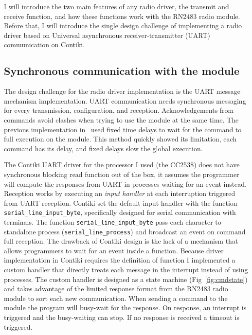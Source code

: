 I will introduce the two main features of any radio driver, the transmit and receive
function, and how these functions work with the RN2483 radio module.
Before that, I will introduce the single design challenge of implementing a radio
driver based on Universal asynchronous receiver-transmitter (UART) communication on Contiki.

\subsection{Synchronous communication with the module}

The design challenge for the radio driver implementation is the
UART message mechanism implementation.
UART communication needs synchronous messaging for every
transmission, configuration, and reception.
Acknowledgements from commands avoid
clashes when trying to use the module at the same time.
The previous implementation in~\cite{8847137} used fixed time delays to
wait for the command to full execution on the module. This method
quickly showed its limitation, each command has its delay, and
fixed delays slow the global execution.

The Contiki UART driver for the processor I used (the CC2538) does not have synchronous
blocking read function out of the box, it assumes the programmer will compute the
responses from UART in processes waiting for an event instead.
Reception works by executing an \emph{input handler} at each interruption
triggered from UART reception.
Contiki set the default input handler with the function
\lstinline{serial_line_input_byte},
specifically designed for serial communication with terminals.
The function \lstinline{serial_line_input_byte} pass each character to standalone
process (\lstinline{serial_line_process}) and broadcast an event on command
full reception.
The drawback of Contiki design is the lack of a mechanism that allows programmers
to wait for an event inside a function.
Because driver implementation in Contiki requires the definition of function
I implemented a custom handler that directly treats each message in the
interrupt instead of using processes.
The custom handler is designed as a state machine (Fig~\ref{fig:cmdstate}) and
takes advantage of the limited response
format from the RN2483 radio module to sort each new communication.
When sending a command to the module the program will busy-wait for the
response. On response, an interrupt is triggered and the busy-waiting can stop.
If no response is received a timeout is triggered.

